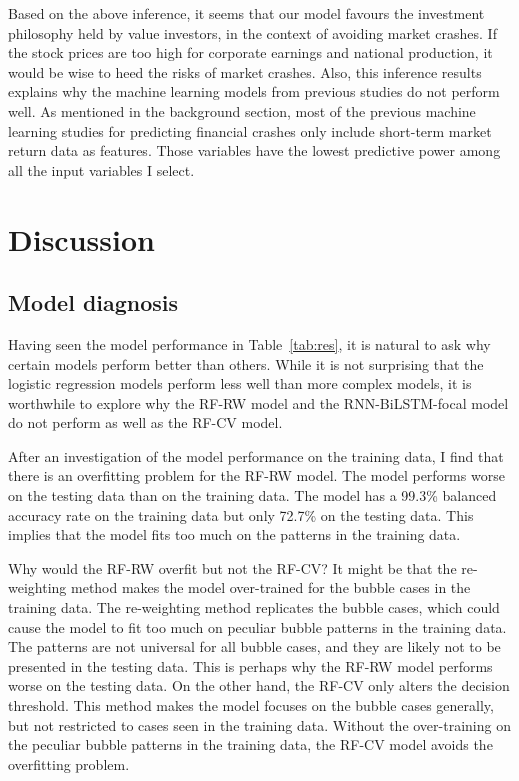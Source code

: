 \documentclass[12pt, man, a4paper, floatsintext]{apa7}
\begin{document}


Based on the above inference, it seems that our model favours the investment philosophy held by value investors, in the context of avoiding market crashes. If the stock prices are too high for corporate earnings and national production, it would be wise to heed the risks of market crashes. Also, this inference results explains why the machine learning models from previous studies do not perform well. As mentioned in the background section, most of the previous machine learning studies for predicting financial crashes only include short-term market return data as features. Those variables have the lowest predictive power among all the input variables I select.


    \section{Discussion}

\subsection{Model diagnosis}

Having seen the model performance in Table~\ref{tab:res}, it is natural to ask why certain models perform better than others. While it is not surprising that the logistic regression models perform less well than more complex models, it is worthwhile to explore why the RF-RW model and the RNN-BiLSTM-focal model do not perform as well as the RF-CV model.

After an investigation of the model performance on the training data, I find that there is an overfitting problem for the RF-RW model. The model performs worse on the testing data than on the training data. The model has a 99.3\% balanced accuracy rate on the training data but only 72.7\% on the testing data. This implies that the model fits too much on the patterns in the training data. 

Why would the RF-RW overfit but not the RF-CV? It might be that the re-weighting method makes the model over-trained for the bubble cases in the training data. The re-weighting method replicates the bubble cases, which could cause the model to fit too much on peculiar bubble patterns in the training data. The patterns are not universal for all bubble cases, and they are likely not to be presented in the testing data. This is perhaps why the RF-RW model performs worse on the testing data. On the other hand, the RF-CV only alters the decision threshold. This method makes the model focuses on the bubble cases generally, but not restricted to cases seen in the training data. Without the over-training on the peculiar bubble patterns in the training data, the RF-CV model avoids the overfitting problem.
\end{document}
